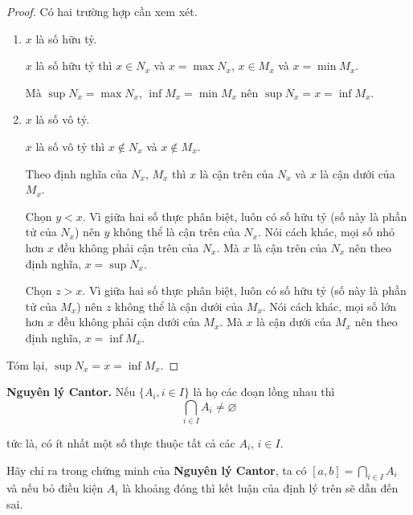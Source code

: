 \documentclass[class=analysis,crop=false]{standalone}
\begin{document}
\begin{proof}
    Có hai trường hợp cần xem xét.
    \begin{enumerate}[label = Trường hợp \arabic*.,itemindent=1.5cm]
        \item $x$ là số hữu tỷ.
            \par $x$ là số hữu tỷ thì $x\in N_{x}$ và $x = \max N_{x}$, $x\in M_{x}$ và $x = \min M_{x}$.
            \par Mà $\sup N_{x} = \max N_{x}$, $\inf M_{x} = \min M_{x}$ nên $\sup N_{x} = x = \inf M_{x}$.
        \item $x$ là số vô tỷ.
            \par $x$ là số vô tỷ thì $x\notin N_{x}$ và $x\notin M_{x}$.
            \par Theo định nghĩa của $N_{x}$, $M_{x}$ thì $x$ là cận trên của $N_{x}$ và $x$ là cận dưới của $M_{x}$.
            \par Chọn $y < x$. Vì giữa hai số thực phân biệt, luôn có số hữu tỷ (số này là phần tử của $N_{x}$) nên $y$ không thể là cận trên của $N_{x}$. Nói cách khác, mọi số nhỏ hơn $x$ đều không phải cận trên của $N_{x}$. Mà $x$ là cận trên của $N_{x}$ nên theo định nghĩa, $x = \sup N_{x}$.
            \par Chọn $z > x$. Vì giữa hai số thực phân biệt, luôn có số hữu tỷ (số này là phần tử của $M_{x}$) nên $z$ không thể là cận dưới của $M_{x}$. Nói cách khác, mọi số lớn hơn $x$ đều không phải cận dưới của $M_{x}$. Mà $x$ là cận dưới của $M_{x}$ nên theo định nghĩa, $x = \inf M_{x}$.
    \end{enumerate}
    \par Tóm lại, $\sup N_{x} = x = \inf M_{x}$.
\end{proof}

\par\textbf{Nguyên lý Cantor.} Nếu $\{ A_{i}, i\in I \}$ là họ các đoạn lồng nhau thì
\[
    \bigcap_{i\in I}A_{i} \ne \varnothing
\]
\par tức là, có ít nhất một số thực thuộc tất cả các $A_{i}$, $i\in I$.

\begin{exercise}
    Hãy chỉ ra trong chứng minh của \textbf{Nguyên lý Cantor}, ta có $[a,b] = \bigcap\limits_{i\in I}A_{i}$ và nếu bỏ điều kiện $A_{i}$ là khoảng đóng thì kết luận của định lý trên sẽ dẫn đến sai.
\end{exercise}
\end{document}
